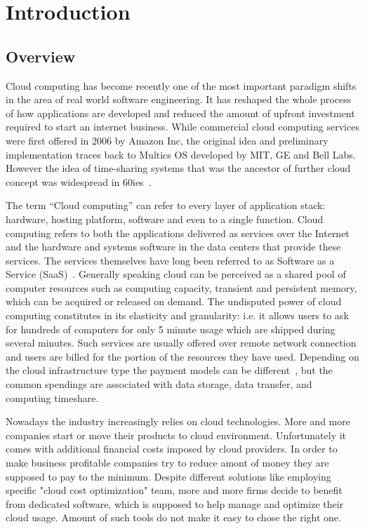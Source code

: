 \documentclass[licencjacka,en]{thesisclass}
\begin{document}
    \chapter{Introduction}


    \section{Overview}

    Cloud computing has become recently one of the most important paradigm shifts in the area of real world software engineering.
    It has reshaped the whole process of how applications are developed and reduced the amount of upfront
    investment required to start an internet business. While commercial cloud computing services were first offered
    in 2006 by Amazon Inc, the original idea and preliminary implementation traces back to Multics OS developed by MIT,
    GE and Bell Labs. However the idea of time-sharing systems that was the ancestor of further cloud
    concept was widespread in 60ies~\cite{Markus}.

    The term “Cloud computing” can refer to every layer of application stack:
    hardware, hosting platform, software and even to a single function.
    Cloud computing refers to both the applications delivered as services over the Internet and
    the hardware and systems software in the data centers that provide these services.
    The services themselves have long been referred to as Software as a Service (SaaS)~\cite{Armbrust}.
    Generally speaking cloud can be perceived as a shared pool of computer resources such as computing capacity,
    transient and persistent memory, which can be acquired or released on demand.
    The undisputed power of cloud computing constitutes in its elasticity and granularity:
    i.e. it allows users to ask for hundreds of computers for only 5 minute usage which
    are shipped during several minutes.
    Such services are usually offered over remote network connection and users are billed
    for the portion of the resources they have used.
    Depending on the cloud infrastructure type the payment models can be different~\cite{Laatikainen},
    but the common spendings are associated with data storage, data transfer, and computing timeshare.

    Nowadays the industry increasingly relies on cloud technologies. More and more companies start or move their products to cloud environment.
    Unfortunately it comes with additional financial costs imposed by cloud providers.
    In order to make business profitable companies try to reduce amont of money they are supposed to pay to the minimum. Despite different solutions like employing specific "cloud cost optimization" team, more and more firms decide to benefit from dedicated software, which is supposed to help manage and optimize their cloud usage. Amount of such tools do not make it easy to chose the right one.
\end{document}
